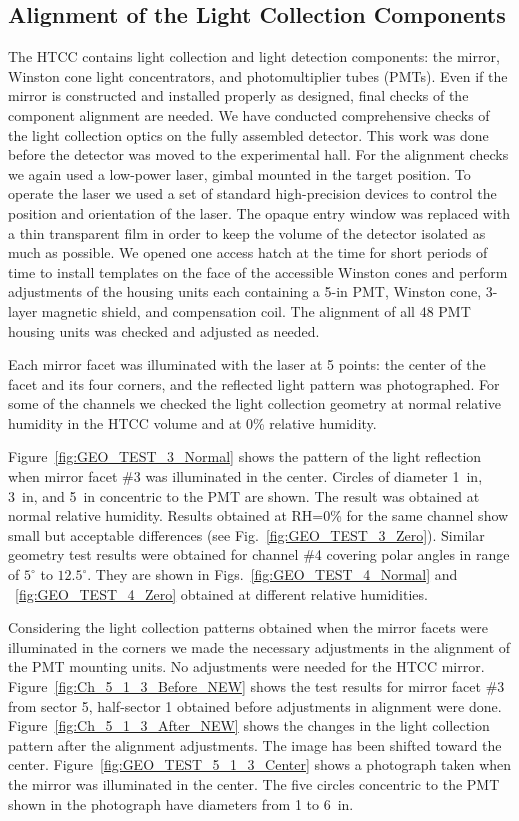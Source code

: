 \subsection{Alignment of the Light Collection Components}

The HTCC contains light collection and light detection components: the mirror, Winston cone light concentrators,
and photomultiplier tubes (PMTs). Even if the mirror is constructed and installed properly as designed, final
checks of the component alignment are needed. We have conducted comprehensive checks of the light collection
optics on the fully assembled detector. This work was done before the detector was moved to the experimental
hall. For the alignment checks we again used a low-power laser, gimbal mounted in the target position. To operate
the laser we used a set of standard high-precision devices to control the position and orientation of the laser.
The opaque entry window was replaced with a thin transparent film in order to keep the volume of the detector
isolated as much as possible. We opened one access hatch at the time for short periods of time to install
templates on the face of the accessible Winston cones and perform adjustments of the housing units each
containing a 5-in PMT, Winston cone, 3-layer magnetic shield, and compensation coil. The alignment of all 48
PMT housing units was checked and adjusted as needed.

Each mirror facet was illuminated with the laser at 5 points: the center of the facet and its four corners, and the
reflected light  pattern was photographed. For some of the channels we checked the light collection geometry at
normal relative humidity in the HTCC volume and at 0\% relative humidity. 

Figure~\ref{fig:GEO_TEST_3_Normal} shows the pattern of the light reflection when mirror facet \#3 was
illuminated in the center. Circles of diameter 1~in, 3~in, and 5~in concentric to the PMT are shown. The result was
obtained at normal relative humidity. Results obtained at RH=0\% for the same channel show small but acceptable
differences (see Fig.~\ref{fig:GEO_TEST_3_Zero}). Similar geometry test results were obtained for channel
\#4 covering polar angles in range of $5^\circ$ to $12.5^\circ$. They are shown in 
Figs.~\ref{fig:GEO_TEST_4_Normal} and ~\ref{fig:GEO_TEST_4_Zero} obtained at different relative
humidities.

Considering the light collection patterns obtained when the mirror facets were illuminated in the corners we made
the necessary adjustments in the alignment of the PMT mounting units. No adjustments were needed for the HTCC
mirror. Figure~\ref{fig:Ch_5_1_3_Before_NEW} shows the test results for mirror facet \#3 from sector 5,
half-sector 1 obtained before adjustments in alignment were done. Figure~\ref{fig:Ch_5_1_3_After_NEW} shows
the changes in the light collection pattern after the alignment adjustments. The image has been shifted toward the
center. Figure~\ref{fig:GEO_TEST_5_1_3_Center} shows a photograph taken when the mirror was illuminated in
the center. The five circles concentric to the PMT shown in the photograph have diameters from 1 to 6~in. 

